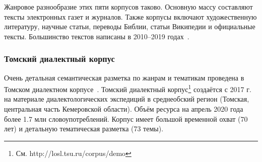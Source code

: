 Жанровое разнообразие этих пяти корпусов таково. Основную массу составляют тексты электронных газет и журналов. Также корпусы включают художественную литературу, научные статьи, переводы Библии, статьи Википедии и официальные тексты. Большинство текстов написаны в 2010--2019 годах~\cite[59]{Arkhangelskiy2020}.

\subsubsection{Томский диалектный корпус}
Очень детальная семантическая разметка по жанрам и тематикам проведена в Томском диалектном корпусе~\cite{Zemicheva2019}.
Томский  диалектный  корпус\footnote{ См. http://losl.tsu.ru/corpus/demo}  создаётся  с  2017  г.  на  материале  диалектологических  экспедиций  в  среднеобский  регион  (Томская,  центральная  часть  Кемеровской  области).  Объём  ресурса на  апрель 2020 года более 1.7 млн словоупотреблений. Корпус имеет большой временной охват (70 лет) и детальную тематическая разметка (73  темы). 
